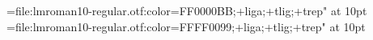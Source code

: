 

  

\font\testa=file:lmroman10-regular.otf:color=FF0000BB;+liga;+tlig;+trep" at 10pt
\font\testb=file:lmroman10-regular.otf:color=FFFF0099;+liga;+tlig;+trep" at 10pt
\testa  \par
\testb  \par
\bye
